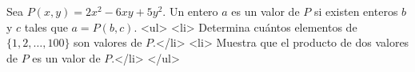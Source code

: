 Sea $P(x,y)=2x^2-6xy+5y^2$. Un entero $a$ es un valor de $P$ si existen enteros $b$ y $c$ tales que $a=P(b,c)$.
<ul>
<li> Determina cuántos elementos de $\{1,2,\dots,100\}$ son valores de $P$.</li>
<li> Muestra que el producto de dos valores de $P$ es un valor de $P$.</li>
</ul>